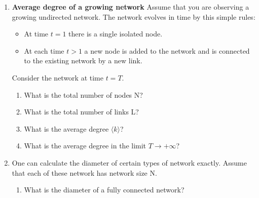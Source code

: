 \documentclass{amsart}
\theoremstyle{definition}
\theoremstyle{remark}
\numberwithin{equation}{section}
\begin{document}
\begin{enumerate}
\begin{enumerate}
\end{enumerate}

\clearpage
\item {\bf Average degree of a growing network} Assume that you are observing a growing undirected network.
The network evolves in time by this simple rules:
\begin{itemize}
\item At time $t = 1$ there is a single isolated node.
\item At each time $t > 1$ a new node is added to the network and is connected
to the existing network by a new link.
\end{itemize}
Consider the network at time $t = T$.
\begin{enumerate}
\item What is the total number of nodes N? \vspace{1cm}



\item What is the total number of links L? \vspace{1cm}



\item What is the average degree $\langle k \rangle$? \vspace{1cm}



\item What is the average degree in the limit $T \rightarrow +\infty $? \vspace{1cm}



\end{enumerate}

\vspace{3cm}
\item One can calculate the diameter of certain types of network exactly. Assume that each of these network has network size N.
\begin{enumerate}
\item What is the diameter of a fully connected network? \vspace{1cm}




\end{enumerate}
\end{enumerate}
\end{document}

